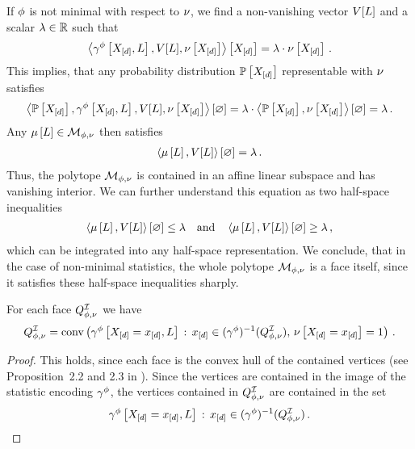 If $\phi$ is not minimal with respect to $\nu$, we find a non-vanishing vector $V[L]$ and a scalar $\lambda\in\mathbb{R}$ such that
\begin{align*}
    \left\langle \gamma^{\phi}\left[X_{[d]},L\right],V[L],\nu\left[X_{[d]}\right]\right\rangle \left[ X_{[d]} \right] = \lambda\cdot\nu\left[X_{[d]}\right] \, .
\end{align*}
This implies, that any probability distribution $\mathbb{P}\left[X_{[d]}\right]$ representable with $\nu$ satisfies
\begin{align*}
    \left\langle \mathbb{P}\left[X_{[d]}\right],\gamma^{\phi}\left[X_{[d]},L\right],V[L],\nu\left[X_{[d]}\right]\right\rangle \left[ \varnothing \right] = \lambda\cdot \left\langle \mathbb{P}\left[X_{[d]}\right],\nu\left[X_{[d]}\right]\right\rangle \left[ \varnothing \right] = \lambda \, .
\end{align*}
Any $\mu\left[L\right]\in\mathcal{M}_{\phi,\nu}$ then satisfies
\begin{align*}
    \left\langle \mu\left[L\right],V[L]\right\rangle \left[ \varnothing \right] = \lambda \, .
\end{align*}
Thus, the polytope $\mathcal{M}_{\phi,\nu}$ is contained in an affine linear subspace and has vanishing interior.
We can further understand this equation as two half-space inequalities
\begin{align*}
    \left\langle \mu\left[L\right],V[L]\right\rangle \left[ \varnothing \right] \leq \lambda \quad \text{and} \quad \left\langle \mu\left[L\right],V[L]\right\rangle \left[ \varnothing \right] \geq \lambda \, ,
\end{align*}
which can be integrated into any half-space representation.
We conclude, that in the case of non-minimal statistics, the whole polytope $\mathcal{M}_{\phi,\nu}$ is a face itself, since it satisfies these half-space inequalities sharply.



\begin{lemma}\label{lem:faceConvHullPreimage}
    For each face $Q^{\mathcal{I}}_{\phi,\nu}$ we have
    \begin{align*}
        Q^{\mathcal{I}}_{\phi,\nu}
        = \mathrm{conv}\left(\gamma^{\phi}\left[X_{[d]}=x_{[d]},L\right]\,:\,x_{[d]}\in(\gamma^{\phi})^{-1}(Q^{\mathcal{I}}_{\phi,\nu}),\,\nu\left[X_{[d]}=x_{[d]}\right]=1\right) \, .
    \end{align*}
\end{lemma}
\begin{proof}
    This holds, since each face is the convex hull of the contained vertices (see Proposition~2.2 and 2.3 in \cite{ziegler_lectures_2013}).
    Since the vertices are contained in the image of the statistic encoding $\gamma^{\phi}$, the vertices contained in $Q^{\mathcal{I}}_{\phi,\nu}$ are contained in the set
    \begin{align*}
        \gamma^{\phi}\left[X_{[d]}=x_{[d]},L\right]\,:\,x_{[d]}\in(\gamma^{\phi})^{-1}(Q^{\mathcal{I}}_{\phi,\nu}) \, .
    \end{align*}
\end{proof}

